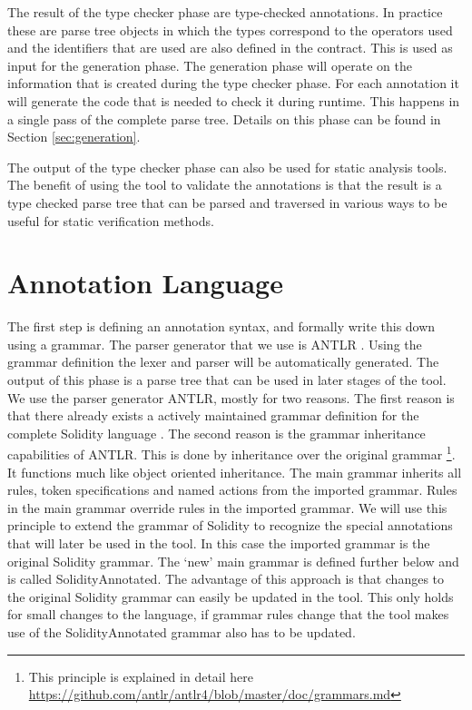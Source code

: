 \documentclass[a4paper]{article}
\begin{document}
The result of the type checker phase are type-checked annotations. In practice these are parse tree objects in which the types correspond to the operators used and the identifiers that are used are also defined in the contract. This is used as input for the generation phase. The generation phase will operate on the information that is created during the type checker phase. For each annotation it will generate the code that is needed to check it during runtime. This happens in a single pass of the complete parse tree. Details on this phase can be found in Section \ref{sec:generation}. \par
The output of the type checker phase can also be used for static analysis tools. The benefit of using the tool to validate the annotations is that the result is a type checked parse tree that can be parsed and traversed in various ways to be useful for static verification methods. 

\newpage
\section{Annotation Language}
\label{sec:annotationlanguage}
The first step is defining an annotation syntax, and formally write this down using a grammar. The parser generator that we use is ANTLR \cite{parr2013definitive}. Using the grammar definition the lexer and parser will be automatically generated. The output of this phase is a parse tree that can be used in later stages of the tool. We use the parser generator ANTLR, mostly for two reasons. The first reason is that there already exists a actively maintained grammar definition for the complete Solidity language \cite{antlroriginalgrammar}. The second reason is the grammar inheritance capabilities of ANTLR. This is done by inheritance over the original grammar \footnote{This principle is explained in detail here \url{https://github.com/antlr/antlr4/blob/master/doc/grammars.md}}. It functions much like object oriented inheritance. The main grammar inherits all rules, token specifications and named actions from the imported grammar. Rules in the main grammar override rules in the imported grammar. We will use this principle to extend the grammar of Solidity to recognize the special annotations that will later be used in the tool. In this case the imported grammar is the original Solidity grammar. The `new' main grammar is defined further below and is called SolidityAnnotated. The advantage of this approach is that changes to the original Solidity grammar can easily be updated in the tool. This only holds for small changes to the language, if grammar rules change that the tool makes use of the SolidityAnnotated grammar also has to be updated.
\end{document}
